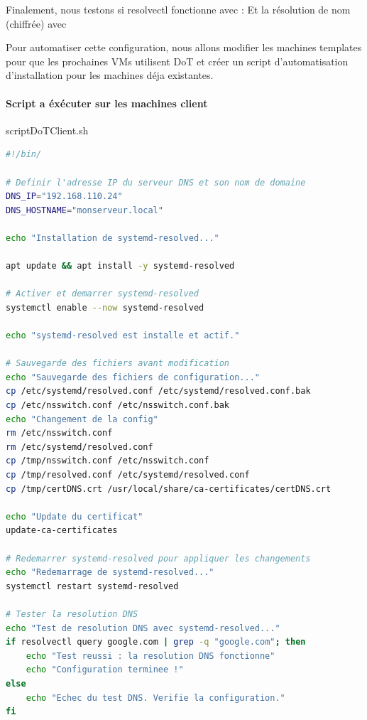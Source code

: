 \documentclass{article}
\begin{document}
Finalement, nous testons si resolvectl fonctionne avec :
Et la résolution de nom (chiffrée) avec 

Pour automatiser cette configuration, nous allons modifier les machines templates pour que les prochaines VMs utilisent DoT et créer un script d'automatisation d'installation pour les machines déja existantes.

\paragraph{Script a éxécuter sur les machines client\\}
\begin{codebox}{scriptDoTClient.sh}
\begin{lstlisting}[language=Bash]
#!/bin/

# Definir l'adresse IP du serveur DNS et son nom de domaine
DNS_IP="192.168.110.24"
DNS_HOSTNAME="monserveur.local"

echo "Installation de systemd-resolved..."

apt update && apt install -y systemd-resolved

# Activer et demarrer systemd-resolved
systemctl enable --now systemd-resolved

echo "systemd-resolved est installe et actif."

# Sauvegarde des fichiers avant modification
echo "Sauvegarde des fichiers de configuration..."
cp /etc/systemd/resolved.conf /etc/systemd/resolved.conf.bak
cp /etc/nsswitch.conf /etc/nsswitch.conf.bak
echo "Changement de la config"
rm /etc/nsswitch.conf
rm /etc/systemd/resolved.conf
cp /tmp/nsswitch.conf /etc/nsswitch.conf
cp /tmp/resolved.conf /etc/systemd/resolved.conf
cp /tmp/certDNS.crt /usr/local/share/ca-certificates/certDNS.crt

echo "Update du certificat"
update-ca-certificates

# Redemarrer systemd-resolved pour appliquer les changements
echo "Redemarrage de systemd-resolved..."
systemctl restart systemd-resolved

# Tester la resolution DNS
echo "Test de resolution DNS avec systemd-resolved..."
if resolvectl query google.com | grep -q "google.com"; then
    echo "Test reussi : la resolution DNS fonctionne"
    echo "Configuration terminee !"
else
    echo "Echec du test DNS. Verifie la configuration."
fi
\end{lstlisting}
\end{codebox}
\end{document}
